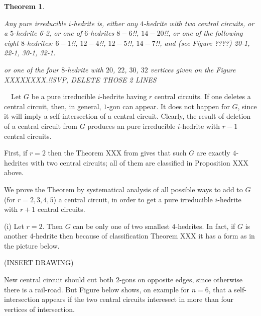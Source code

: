 \documentclass[12pt]{article}
\newtheorem{theor}{Theorem}
\newcommand{\proof}{\noindent{\bf Proof.}\ \ }
\begin{document}
%
%







\begin{theor}\label{TheOneWithSimpleCentralCircuit}

Any pure irreducible $i$-hedrite is, either any $4$-hedrite with two central circuits, or a $5$-hedrite 6-2, or one of $6$-hedrites 
$8-6$!!, $14-{20}$!!, or one of the following eight $8$-hedrites: 
$6-{1}$!!, $12-{4}$!!, $12-{5}$!!, $14-{7}$!!, and (see Figure ????) 20-1, 22-1, 30-1, 32-1.

or one of the four $8$-hedrite with $20$, $22$, $30$, $32$ vertices given on the Figure XXXXXXXX.!!SVP, DELETE THOSE 2 LINES

\end{theor}


\proof Let $G$ be a pure irreducible $i$-hedrite having $r$ central circuits. 
If one deletes a central circuit, then, in general, $1$-gon can appear. It 
does not happen for $G$, since it will imply a self-intersection of a central 
circuit. Clearly, the result of deletion of a central circuit from $G$ 
produces an pure irreducible $i$-hedrite with $r-1$ central circuits.

First, if $r=2$ then the Theorem XXX from \cite{DSt} gives that such $G$ are 
exactly $4$-hedrites with two central circuits; all of them are classified 
in Proposition XXX above.

We prove the Theorem by systematical analysis of all possible ways to add 
to $G$ (for $r=2,3,4,5$) a central circuit, in order to get a pure 
irreducible $i$-hedrite with $r+1$ central circuits. 


(i) Let $r=2$. Then $G$ can be only one of two smallest $4$-hedrites. In 
fact, if $G$ is another $4$-hedrite then because of classification Theorem 
XXX it has a form as in the picture below.

(INSERT DRAWING)

New central circuit should cut both $2$-gons on opposite edges, since otherwise there is a rail-road. But Figure below shows, on example for $n=6$, that a self-intersection appears if the two central circuits interesect in more than four vertices of intersection.
\end{document}
